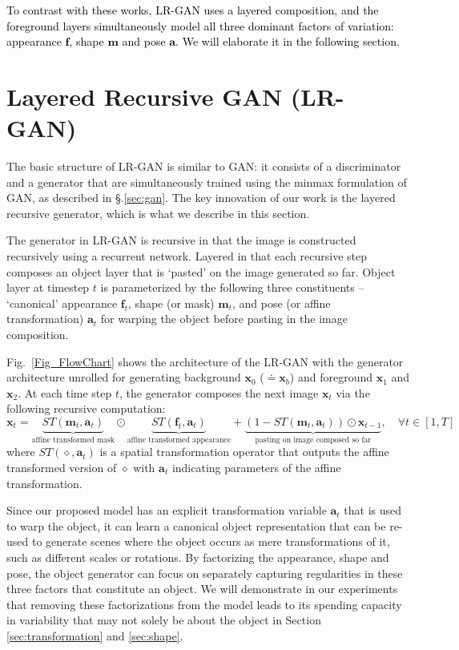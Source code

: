 \documentclass{article} \usepackage{iclr2017_conference,times}
\begin{document}
\textcolor{black}{To contrast with these works, LR-GAN uses a layered composition, and the foreground layers simultaneously model all three dominant factors of variation: appearance $\bm{f}$, shape $\bm{m}$ and pose $\bm{a}$. We will elaborate it in the following section.}








\section{Layered  Recursive GAN (LR-GAN)} 
\label{sec:model}
\vspace{-5pt}
The basic structure of LR-GAN is similar to GAN: it consists of a discriminator and a generator that are simultaneously trained using the minmax formulation of GAN, as described in \S.\ref{sec:gan}. The key innovation of our work is the layered recursive generator, which is what we describe in this section. 

The generator in LR-GAN is recursive in that the image is constructed recursively 
using a recurrent network. Layered in that each recursive step composes an object layer that is 
`pasted' on the image generated so far. Object layer at timestep $t$ is parameterized by the following three constituents -- `canonical' appearance $\bm{f}_t$, shape (or mask) $\bm{m}_t$, and pose (or affine transformation) $\bm{a}_t$ for warping the object before pasting in the image composition. 

Fig.~\ref{Fig_FlowChart} shows the  architecture of the LR-GAN with the generator architecture 
unrolled for generating background $\bm{x}_0$ ($\doteq \bm{x}_b$) 
and foreground $\bm{x}_1$ and $\bm{x}_2$. At each time step $t$, the generator composes the next image $\bm{x}_t$ via the following recursive computation: 
\begin{equation}
\bm{x}_t = \underbrace{ST(\bm{m}_t,\bm{a}_t)}_{\text{affine transformed mask}} 
\odot \underbrace{ST(\bm{f}_t,\bm{a}_t)}_{\text{affine transformed appearance}} + 
\underbrace{(1- ST(\bm{m}_t,\bm{a}_t)) \odot \bm{x}_{t-1}}_{\text{pasting on image composed so far}}, 
\quad \forall t \in [1,T]
\label{eqn:pasting}
\end{equation}
where $ST(\diamond, \bm{a}_t)$ is a spatial transformation operator that outputs the affine transformed version of $\diamond$ with $\bm{a}_t$ indicating parameters of the affine transformation.

Since our proposed model has an explicit transformation variable $\bm{a}_t$ that is used to warp the object, it can learn a canonical object representation that can be re-used to generate scenes where the object occurs as mere transformations of it, such as different scales or rotations. By factorizing the appearance, shape and pose, the object generator can focus on separately capturing regularities in these three factors that constitute an object. We will demonstrate in our experiments that removing these factorizations from the model leads to its spending capacity in variability that may not solely be about the object in Section \ref{sec:transformation} and \ref{sec:shape}.
\end{document}
